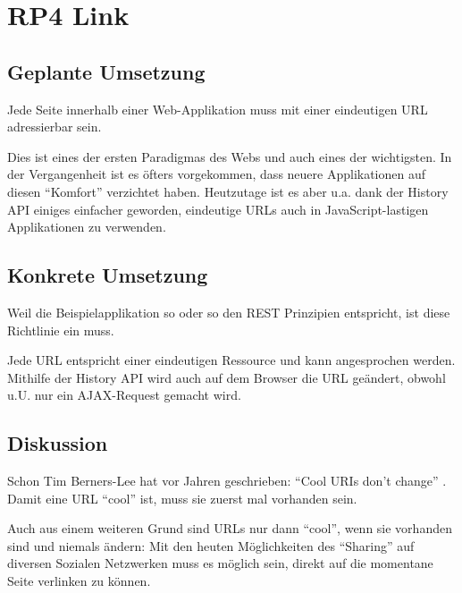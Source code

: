 \section{RP4 Link}
\label{sec:principle-rp4-link}

\subsection*{Geplante Umsetzung}
Jede Seite innerhalb einer Web-Applikation muss mit einer eindeutigen URL adressierbar
sein.

Dies ist eines der ersten Paradigmas des Webs und auch eines der wichtigsten. In der Vergangenheit
ist es öfters vorgekommen, dass neuere Applikationen auf diesen ``Komfort'' verzichtet haben.
Heutzutage ist es aber u.a. dank der History API \cite{HistoryAPI} einiges
einfacher geworden, eindeutige URLs auch in JavaScript-lastigen Applikationen zu
verwenden.


\subsection*{Konkrete Umsetzung}
Weil die Beispielapplikation so oder so den REST \cite{REST} Prinzipien entspricht,
ist diese Richtlinie ein muss.

Jede URL entspricht einer eindeutigen Ressource und kann angesprochen werden.
Mithilfe der History API \cite{HistoryAPI} wird auch auf dem Browser die URL
geändert, obwohl u.U. nur ein AJAX-Request gemacht wird.

\subsection*{Diskussion}
Schon Tim Berners-Lee hat vor Jahren geschrieben: ``Cool URIs don't change'' \cite{CoolURIsTBL}.
Damit eine URL ``cool'' ist, muss sie zuerst mal vorhanden sein.

Auch aus einem weiteren Grund sind URLs nur dann ``cool'', wenn sie vorhanden sind
und niemals ändern: Mit den heuten Möglichkeiten des ``Sharing'' auf diversen Sozialen
Netzwerken muss es möglich sein, direkt auf die momentane Seite verlinken zu können.